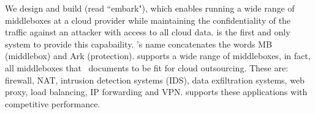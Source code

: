 %    
%    
% 
     
     
     
  
    We design and build \sys (read ``embark"), which enables running a wide range of middleboxes at a cloud provider while maintaining the confidentiality of the traffic against an attacker with access to all cloud data. \sys is the first and only system to provide this capabaility.  \sys's name concatenates the words MB (middlebox) and Ark (protection). \sys supports a wide range of middleboxes, in fact, all middleboxes that~\cite{aplomb} documents to be fit for cloud outsourcing. These are: firewall, NAT, intrusion detection systems (IDS), data exfiltration systems, web proxy, load balancing, IP forwarding and VPN. \sys supports these applications with competitive performance. 
    
